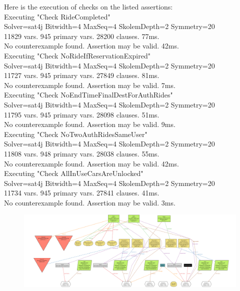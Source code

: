 
\vfill
Here is the execution of checks on the listed assertions:\\

Executing "Check RideCompleted"\\
Solver=sat4j Bitwidth=4 MaxSeq=4 SkolemDepth=2 Symmetry=20\\
11829 vars. 945 primary vars. 28200 clauses. 77ms.\\
No counterexample found. Assertion may be valid. 42ms.\\

Executing "Check NoRideIfReservationExpired"\\
Solver=sat4j Bitwidth=4 MaxSeq=4 SkolemDepth=2 Symmetry=20\\
11727 vars. 945 primary vars. 27849 clauses. 81ms.\\
No counterexample found. Assertion may be valid. 7ms.\\

Executing "Check NoEndTimeFinalDestForAuthRides"\\
Solver=sat4j Bitwidth=4 MaxSeq=4 SkolemDepth=2 Symmetry=20\\
11795 vars. 945 primary vars. 28098 clauses. 51ms.\\
No counterexample found. Assertion may be valid. 9ms.\\

Executing "Check NoTwoAuthRidesSameUser"\\
Solver=sat4j Bitwidth=4 MaxSeq=4 SkolemDepth=2 Symmetry=20\\
11808 vars. 948 primary vars. 28038 clauses. 55ms.\\
No counterexample found. Assertion may be valid. 42ms.\\

Executing "Check AllInUseCarsAreUnlocked"\\
Solver=sat4j Bitwidth=4 MaxSeq=4 SkolemDepth=2 Symmetry=20\\
11734 vars. 945 primary vars. 27841 clauses. 41ms.\\
No counterexample found. Assertion may be valid. 3ms.\\

\begin{figure}[H]
\begin{center}
		\vspace*{-150pt}
		\includegraphics[width=885pt, angle= -90]{./pictures/alloy_model_diagram.png}
		\label{class_diagram}
\end{center}
\end{figure}

